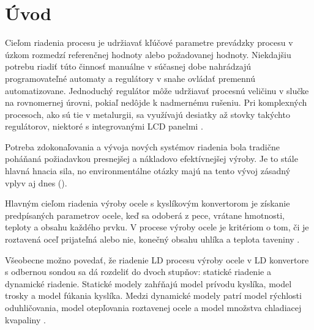 \documentclass[]{tukediphc}
\begin{document}
\renewcommand\theHfigure{\theHsection.\arabic{figure}}
\renewcommand\theHtable{\theHsection.\arabic{table}}


\prvastrana


\thispagestyle{empty}
\tableofcontents
\newpage
%
%


\setcounter{page}{1}
\setcounter{equation}{0}
\setcounter{figure}{0}
\setcounter{table}{0}

\section{Úvod}

Cieľom riadenia procesu je udržiavať kľúčové parametre prevádzky procesu v úzkom rozmedzí referenčnej hodnoty alebo požadovanej hodnoty. Niekdajšiu potrebu riadiť túto činnosť manuálne v súčasnej dobe nahrádzajú programovateľné automaty a regulátory v snahe ovládať premennú automatizovane. Jednoduchý regulátor môže udržiavať procesnú veličinu v slučke na rovnomernej úrovni, pokiaľ nedôjde k nadmernému rušeniu. Pri komplexných procesoch, ako sú tie v metalurgii, sa využívajú desiatky až stovky takýchto regulátorov, niektoré s integrovanými LCD panelmi \citep{Al-Megren2016}.

Potreba zdokonaľovania a vývoja nových systémov riadenia bola tradične poháňaná požiadavkou presnejšej a nákladovo efektívnejšej výroby. Je to stále hlavná hnacia sila, no environmentálne otázky majú na tento vývoj zásadný vplyv aj dnes (\citep{Widlund1998}).

Hlavným cieľom riadenia výroby ocele s kyslíkovým konvertorom je získanie predpísaných parametrov ocele, keď sa odoberá z pece, vrátane hmotnosti, teploty a obsahu každého prvku. V procese výroby ocele je kritériom o tom, či je roztavená oceľ prijateľná alebo nie, konečný obsahu uhlíka a teplota taveniny \citep{Wang2010}.

Všeobecne možno povedať, že riadenie LD procesu výroby ocele v LD konvertore s odbernou sondou sa dá rozdeliť do dvoch stupňov: statické riadenie a dynamické riadenie. Statické modely zahŕňajú model prívodu kyslíka, model trosky a model fúkania kyslíka. Medzi dynamické modely patrí model rýchlosti oduhličovania, model otepľovania roztavenej ocele a model množstva chladiacej kvapaliny \citep{Wang2010}.
\end{document}
